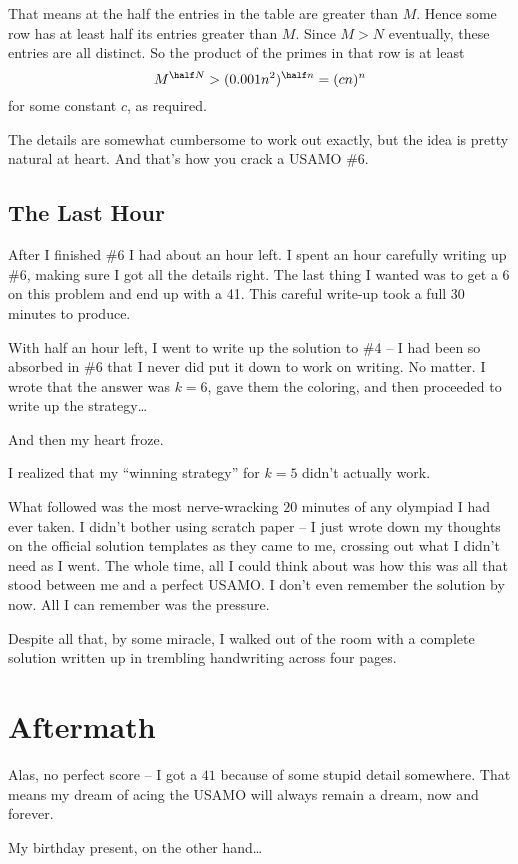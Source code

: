 \documentclass[11pt]{scrartcl}
\begin{document}
That means at the half the entries in the table are greater than $M$. Hence some row has at least half its entries greater than $M$.
Since $M > N$ eventually, these entries are all distinct. So the product of the primes in that row is at least
\[ M^{\half N} > (0.001n^2)^{\half n} = (cn)^n \]
for some constant $c$, as required.

The details are somewhat cumbersome to work out exactly, but the idea is pretty natural at heart. And that's how you crack a USAMO \#6.

\subsection{The Last Hour}
After I finished \#6 I had about an hour left. I spent an hour carefully writing up \#6, making sure I got all the details right. The last thing I wanted was to get a 6 on this problem and end up with a 41. This careful write-up took a full 30 minutes to produce.

With half an hour left, I went to write up the solution to \#4 -- I had been so absorbed in \#6 that I never did put it down to work on writing.
No matter. I wrote that the answer was $k=6$, gave them the coloring, and then proceeded to write up the strategy\dots

And then my heart froze.

I realized that my ``winning strategy'' for $k=5$ didn't actually work.

What followed was the most nerve-wracking $20$ minutes of any olympiad I had ever taken.
I didn't bother using scratch paper -- I just wrote down my thoughts on the official solution templates as they came to me, crossing out what I didn't need as I went.
The whole time, all I could think about was how this was all that stood between me and a perfect USAMO.
I don't even remember the solution by now. All I can remember was the pressure.

Despite all that, by some miracle, I walked out of the room with a complete solution written up in trembling handwriting across four pages.

\section{Aftermath}
Alas, no perfect score -- I got a $41$ because of some stupid detail somewhere.
That means my dream of acing the USAMO will always remain a dream, now and forever.

My birthday present, on the other hand\dots
\end{document}
